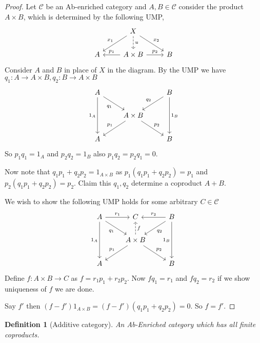 \documentclass[12pt]{article}
\numberwithin{equation}{section}
\newcounter{dummy} \numberwithin{dummy}{section}
\newtheorem{definition}[dummy]{Definition}
\begin{document}
	\begin{proof}	
		Let $\mathcal{C}$ be an Ab-enriched category and $A,B\in \mathcal{C}$ consider the product $A\times B$, which is determined by the following UMP,
		\[\begin{tikzcd}
			& X \\
			A & A\times B & B
			\arrow["{p_1}"', from=2-2, to=2-1]
			\arrow["{p_2}", from=2-2, to=2-3]
			\arrow["u", dashed, from=1-2, to=2-2]
			\arrow["{x_1}"', from=1-2, to=2-1]
			\arrow["{x_2}", from=1-2, to=2-3]
		\end{tikzcd}\]
		Consider $A$ and $B$ in place of $X $ in the diagram. By the UMP we have $q_1: A \to A\times B, q_2: B \to A\times B$
		\[\begin{tikzcd}
			A && B \\
			& {A\times B} \\
			A && B
			\arrow["{p_1}"', from=2-2, to=3-1]
			\arrow["{p_2}", from=2-2, to=3-3]
			\arrow["{q_2}"', from=1-3, to=2-2]
			\arrow["{q_1}"', from=1-1, to=2-2]
			\arrow["{1_A}"', from=1-1, to=3-1]
			\arrow["{1_B}", from=1-3, to=3-3]
		\end{tikzcd}\]
		So $p_1q_1=1_A$ and $p_2q_2=1_B$ also $p_1q_2=p_2q_1=0$.
		
		Now note that $q_1p_1+q_2p_2=1_{A\times B}$ as $p_1(q_1p_1+q_2p_2)=p_1$ and $p_2(q_1p_1+q_2p_2)=p_2$. Claim this $q_1,q_2$ determine a coproduct $A +B$.
		
		We wish to show the following UMP holds for some arbitrary $C \in \mathcal{C}$
		\[\begin{tikzcd}
			A & C & B \\
			& {A\times B} \\
			A && B
			\arrow["{q_1}"', from=1-1, to=2-2]
			\arrow["{q_2}", from=1-3, to=2-2]
			\arrow["{p_1}"', from=2-2, to=3-1]
			\arrow["{p_2}", from=2-2, to=3-3]
			\arrow["{1_B}"', from=1-3, to=3-3]
			\arrow["{1_A}"', from=1-1, to=3-1]
			\arrow["{r_1}", from=1-1, to=1-2]
			\arrow["{r_2}"', from=1-3, to=1-2]
			\arrow["{f}"',dashed, from=2-2, to=1-2]
		\end{tikzcd}\]
		Define $f: A\times B \to C$ as $f=r_1p_1+r_2p_2$. Now $fq_1=r_1$ and $fq_2=r_2$ if we show uniqueness of $f$ we are done.
		
		Say $f'$ then $(f-f')1_{A \times B}=(f-f')(q_1p_1+q_2p_2)=0$. So $f=f'$.
		
		
	\end{proof}
	
	
	\begin{definition}[Additive category]
		An Ab-Enriched category which has all finite coproducts.
	\end{definition}
	
\end{document}
